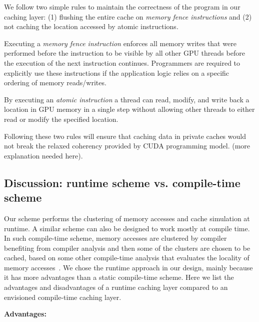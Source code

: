 We follow two simple rules to maintain the correctness of the program in our caching layer: (1) flushing the entire
cache on {\it memory fence instructions} and (2) not caching the location accessed by {atomic instructions}. 

Executing a {\it memory fence instruction} enforces all memory writes that were performed before the instruction to be
visible by all other GPU threads before the execution of the next instruction continues. Programmers are required to
explicitly use these instructions if the application logic relies on a specific ordering of memory reads/writes. 

By executing an {\it atomic instruction} a thread can read, modify, and write back a location in GPU memory in a single step without
allowing other threads to either read or modify the specified location.

Following these two rules will ensure that caching data in private caches would not break the relaxed coherency provided
by CUDA programming model. (more explanation needed here).



\subsection{Discussion: runtime scheme vs. compile-time scheme}

Our scheme performs the clustering of memory accesses and cache simulation at runtime. A similar scheme can also be
designed to work mostly at compile time. In such compile-time scheme, memory accesses are clustered by compiler
benefiting from compiler analysis and then some of the clusters are chosen to be cached, based on some other
compile-time analysis that evaluates the locality of memory accesses~\cite{}. We chose the runtime approach in our
design, mainly because it has more advantages than a static compile-time scheme. Here we list the advantages and
disadvantages of a runtime caching layer compared to an envisioned compile-time caching layer.

{\bf Advantages:}

